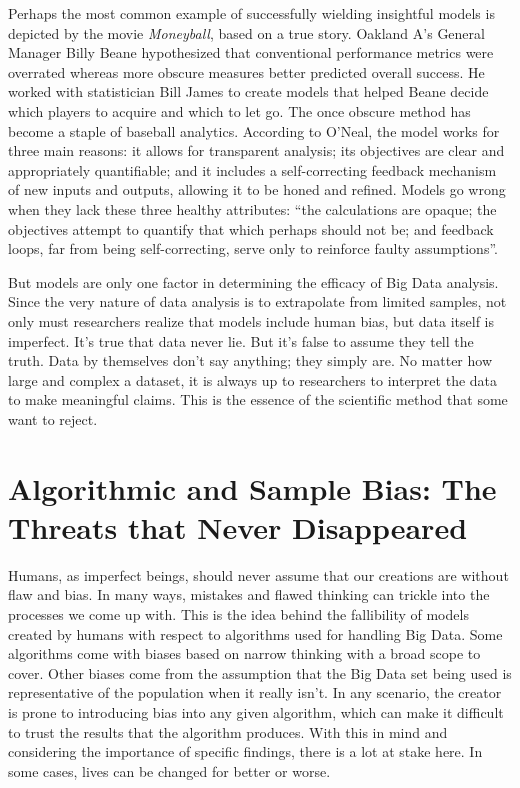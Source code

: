 \documentclass[sigconf]{acmart}
\begin{document}
Perhaps the most common example of successfully wielding insightful models is depicted by the movie {\em Moneyball}, based on a true story. Oakland A's General Manager Billy Beane hypothesized that conventional performance metrics were overrated whereas more obscure measures better predicted overall success. He worked with statistician Bill James to create models that helped Beane decide which players to acquire and which to let go. The once obscure method has become a staple of baseball analytics. According to O'Neal, the model works for three main reasons: it allows for transparent analysis; its objectives are clear and appropriately quantifiable; and it includes a self-correcting feedback mechanism of new inputs and outputs, allowing it to be honed and refined. Models go wrong when they lack these three healthy attributes: ``the calculations are opaque; the objectives attempt to quantify that which perhaps should not be; and feedback loops, far from being self-correcting, serve only to reinforce faulty assumptions''\cite{Wharton2016}.

But models are only one factor in determining the efficacy of Big Data analysis. Since the very nature of data analysis is to extrapolate from limited samples, not only must researchers realize that models include human bias, but data itself is imperfect. It's true that data never lie. But it's false to assume they tell the truth. Data by themselves don't say anything; they simply are\cite{Crawford2013}. No matter how large and complex a dataset, it is always up to researchers to interpret the data to make meaningful claims. This is the essence of the scientific method that some want to reject.

\section{Algorithmic and Sample Bias: The Threats that Never Disappeared}

Humans, as imperfect beings, should never assume that our creations are without flaw and bias. In many ways, mistakes and flawed thinking can trickle into the processes we come up with. This is the idea behind the fallibility of models created by humans with respect to algorithms used for handling Big Data. Some algorithms come with biases based on narrow thinking with a broad scope to cover. Other biases come from the assumption that the Big Data set being used is representative of the population when it really isn't. In any scenario, the creator is prone to introducing bias into any given algorithm, which can make it difficult to trust the results that the algorithm produces. With this in mind and considering the importance of specific findings, there is a lot at stake here. In some cases, lives can be changed for better or worse.
\end{document}

